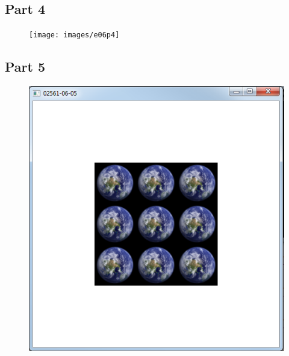\documentclass[11pt]{article}
\begin{document}
\subsection{Part 4}
\begin{figure}[H]
	\centering
	\texttt{[image: images/e06p4]}
	\label{fig:e06p4}
\end{figure}

\subsection{Part 5}
\begin{figure}[H]
	\centering
	\includegraphics[width=0.5\linewidth]{images/e06p5}
	\label{fig:e06p5}
\end{figure}
\end{document}

